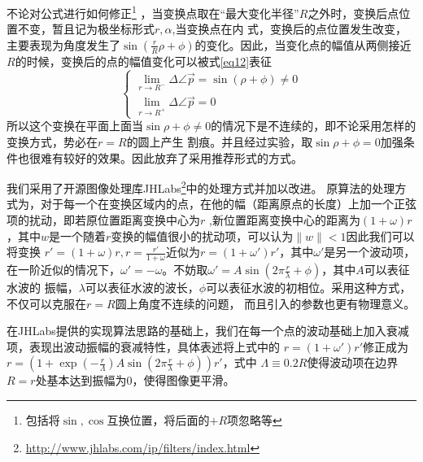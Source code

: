 \documentclass[UTF8,a4paper]{paper}
\begin{document}
不论对公式进行如何修正\footnote{包括将$\sin,\cos$互换位置，将后面的$+R$项忽略等}
，当变换点取在“最大变化半径”$R$之外时，变换后点位置不变，暂且记为极坐标形式$r,\alpha$,当变换点在内
式，变换后的点位置发生改变，主要表现为角度发生了$\sin(\frac{r}{R}\rho + \phi)$的变化。因此，当变化点的幅值从两侧接近
$R$的时候，变换后的点的幅值变化可以被式\ref{eq12}表征
\begin{equation}\begin{cases}
    \displaystyle{\lim_{r\rightarrow R^-} \Delta \angle{\vec{p}} = \sin(\rho + \phi) \ne 0} \\
    \displaystyle{\lim_{r\rightarrow R^+} \Delta \angle{\vec{p}} = 0} 
\label{eq12}\end{cases}\end{equation}
所以这个变换在平面上面当$\sin{\rho + \phi} \ne 0$的情况下是不连续的，即不论采用怎样的变换方式，势必在$r = R$的圆上产生
割痕。并且经过实验，取$\sin{\rho + \phi} = 0$加强条件也很难有较好的效果。因此放弃了采用推荐形式的方式。

我们采用了开源图像处理库JHLabs\footnote{\url{http://www.jhlabs.com/ip/filters/index.html}}中的处理方式并加以改进。
原算法的处理方式为，对于每一个在变换区域内的点，在他的幅（距离原点的长度）上加一个正弦项的扰动，即若原位置距离变换中心为$r$
,新位置距离变换中心的距离为$(1+\omega)r$，其中$w$是一个随着$r$变换的幅值很小的扰动项，可以认为$\|w\| < 1$因此我们可以将变换
$r' = (1+\omega) r,r = \frac{r'}{1+\omega}$近似为$r = (1+\omega')r'$，其中$\omega'$是另一个波动项，
在一阶近似的情况下，$\omega' = -\omega$。不妨取$\omega' = A\sin(2\pi\frac{r}{\lambda}+\phi)$，其中$A$可以表征水波的
振幅，$\lambda$可以表征水波的波长，$\phi$可以表征水波的初相位。采用这种方式，不仅可以克服在$r=R$圆上角度不连续的问题，
而且引入的参数也更有物理意义。

在JHLabs提供的实现算法思路的基础上，我们在每一个点的波动基础上加入衰减项，表现出波动振幅的衰减特性，具体表述将上式中的
$r = (1 + \omega')r'$修正成为$r = (1 + \exp(-\frac{r}{\Lambda}) A\sin(2\pi\frac{r}{\lambda}+\phi))r'$，式中
$\Lambda \equiv 0.2R$使得波动项在边界$R = r$处基本达到振幅为0，使得图像更平滑。
\end{document}
